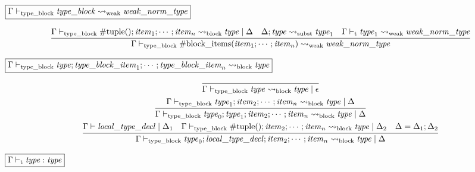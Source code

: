 $\fbox{$\Gamma \vdash_\mathrm{type\_block} \mathit{type\_block} \rightsquigarrow_\mathrm{weak} \mathit{weak\_norm\_type}$}$

\begin{gather*}
    \infer{\Gamma \vdash_\mathrm{type\_block} \mathrm{\#block\_items}(\mathit{item}_1; \cdots; \mathit{item}_n) \rightsquigarrow_\mathrm{weak} \mathit{weak\_norm\_type}}{
        \Gamma \vdash_\mathrm{type\_block} \mathrm{\#tuple}(); \mathit{item}_1; \cdots; \mathit{item}_n \rightsquigarrow_\mathrm{block} \mathit{type} \mid \Delta
        &
        \Delta; \mathit{type} \rightsquigarrow_\mathrm{subst} \mathit{type}_1
        &
        \Gamma \vdash_\mathrm{t} \mathit{type}_1 \rightsquigarrow_\mathrm{weak} \mathit{weak\_norm\_type}
    }
\end{gather*}

$\fbox{$\Gamma \vdash_\mathrm{type\_block} \mathit{type}; \mathit{type\_block\_item}_1; \cdots; \mathit{type\_block\_item}_n \rightsquigarrow_\mathrm{block} \mathit{type}$}$

\begin{gather*}
    \infer{\Gamma \vdash_\mathrm{type\_block} \mathit{type} \rightsquigarrow_\mathrm{block} \mathit{type} \mid \epsilon}{}
    \\
    \infer{\Gamma \vdash_\mathrm{type\_block} \mathit{type}_0; \mathit{type}_1; \mathit{item}_2; \cdots; \mathit{item}_n \rightsquigarrow_\mathrm{block} \mathit{type} \mid \Delta}{
        \Gamma \vdash_\mathrm{type\_block} \mathit{type}_1; \mathit{item}_2; \cdots; \mathit{item}_n \rightsquigarrow_\mathrm{block} \mathit{type} \mid \Delta
    }
    \\
    \infer{\Gamma \vdash_\mathrm{type\_block} \mathit{type}_0; \mathit{local\_type\_decl}; \mathit{item}_2; \cdots; \mathit{item}_n \rightsquigarrow_\mathrm{block} \mathit{type} \mid \Delta}{
        \Gamma \vdash \mathit{local\_type\_decl} \mid \Delta_1
        &
        \Gamma \vdash_\mathrm{type\_block} \mathrm{\#tuple}(); \mathit{item}_2; \cdots; \mathit{item}_n \rightsquigarrow_\mathrm{block} \mathit{type} \mid \Delta_2
        &
        \Delta = \Delta_1; \Delta_2
    }
\end{gather*}

$\fbox{$\Gamma \vdash_\mathrm{t} \mathit{type}: \mathit{type}$}$


